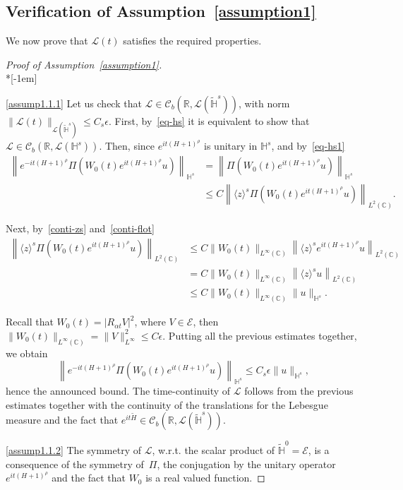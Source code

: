 \documentclass[10pt]{amsart}
\theoremstyle{definition}\newtheorem{defi}[theo]{Definition}\newtheorem{rema}[theo]{Remark}\newtheorem{exam}[theo]{Example}\newtheorem{exem}[theo]{Example}\newtheorem{nota}[theo]{Notation}
\newcommand{\C}{\mathbb{C}}
\newcommand{\R}{\mathbb{R}}
\newcommand{\HH}{\mathbb{H}}
\newcommand{\E}{\mathcal{E}}
\newcommand{\clL}{\mathcal{L}}
\newcommand{\clC}{\mathcal{C}}
\renewcommand{\L}{\mathscr{L}}
\newcommand*\eps{\epsilon}
\newcommand{\wt}{\widetilde}
\newcommand{\<}{\langle}
\renewcommand{\>}{\rangle}
\begin{document}
\subsection{Verification of Assumption~\ref{assumption1}}\label{para4.3}
We now prove that $ \L(t)$ satisfies the required properties.
\begin{proof}[{Proof of Assumption~\ref{assumption1}}]\ \\*[-1em]

\eqref{assump1.1.1} Let us check that $\L \in \clC_b(\R, \clL(\widetilde{\HH}^{s}))$, with norm $\| \L(t) \|_{ \clL(\widetilde{\HH}^{s})} \leq C_s \eps$. First, by~\eqref{eq-hs} it is equivalent to show that $\L \in \clC_b(\R, \clL({\HH}^{s}))$. Then, since $e^{it {(H+1)^{\rho}}} $ is unitary in ${\HH}^{s}$, and by~\eqref{eq-hs1}
\begin{align*}
\left\| e^{-it (H+1)^{\rho}} \Pi\left(W_0(t)e^{it (H+1)^{\rho}} u\right)
\right\|_{{\HH}^{s}}&=\left\| \Pi\left(W_0(t)e^{it (H+1)^{\rho}} u\right) \right\|_{{\HH}^{s}}\\
&\leq C \left\| \langle z \rangle^{ s} \Pi \left(W_0(t)e^{it (H+1)^{\rho}} u\right) \right\|_{L^2(\C)}.
\end{align*}


Next, by~\eqref{conti-zs} and~\eqref{conti-flot}
\begin{align*}
\left\| \langle z \rangle^{ s} \Pi \left(W_0(t)e^{it (H+1)^{\rho}} u\right) \right\|_{L^2(\C)} &\leq C \| W_0(t) \|_{L^\infty(\C)} \left\| \langle z \rangle^{ s} e^{it (H+1)^{\rho}} u \right\|_{L^2(\C)}\\
&= C \| W_0(t) \|_{L^\infty(\C)} \left\| \langle z \rangle^{ s} u\right\|_{L^2(\C)}\\
& \leq C \| W_0(t) \|_{L^\infty(\C)} \| u \|_{\HH^s}.
\end{align*}


Recall that $W_0(t)=|R_{\alpha t}V|^2$, where $V \in \E$, then $\| W_0(t)
\|_{L^\infty(\C)} =\| V\|^2_{L^\infty} \leq C \eps $. Putting all the previous estimates together, we obtain
\[
\left\| e^{-it (H+1)^{\rho}} \Pi\left(W_0(t)e^{it (H+1)^{\rho}} u\right) \right\|_{{\HH}^{s}} \leq C_s\eps \| u\|_{{\HH}^{s}},
\]
hence the announced bound. The time-continuity of $\L$ follows from the previous estimates together with the continuity of the translations for the Lebesgue measure and the fact that $e^{it \wt{H}} \in \clC_b(\R, \clL(\widetilde{\HH}^{s}))$.

\eqref{assump1.1.2} The symmetry of $\L$, w.r.t. the scalar product of $\widetilde{\HH}^{0}=\E$, is a consequence of the symmetry of~$\Pi$, the conjugation by the unitary operator $e^{it {(H+1)^{\rho}}} $ and the fact that $W_0$ is a real valued function.


\end{proof}
\end{document}
